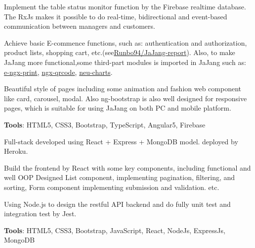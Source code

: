 \documentclass[letterpaper]{deedy-resume} %
\begin{document}
\begin{minipage}[t]{0.66\textwidth}
\vspace{\topsep} %
\begin{tightitemize}
\item Implement the table status monitor function by the Firebase realtime database. The RxJs makes it possible to do real-time, bidirectional and event-based communication between managers and customers.
\item Achieve basic E-commence functions, such as: authentication and authorization, product lists, shopping cart, etc.(see\href{https://github.com/Runbo94/JaJang-report}{Runbo94/JaJang-report}). Also, to make JaJang more functional,some third-part modules is imported in JaJang such as: \href{https://github.com/laixiangran/e-ngx-print}{e-ngx-print}, \href{https://github.com/nacardin/ngx-qrcode}{ngx-qrcode},
\href{https://www.npmjs.com/package/neu-charts}{neu-charts}.
\item  Beautiful style of pages including some animation and fashion web component like card, carousel, modal. Also ng-bootstrap is also well designed for responsive pages, which is suitable for using JaJang on both PC and mobile platform.
\item \textbf{Tools}: HTML5, CSS3, Bootstrap, TypeScript, Angular5, Firebase
\end{tightitemize}

\sectionspace %


\vspace{\topsep} %
\begin{tightitemize}
\item Full-stack developed using React + Express + MongoDB model.
deployed by Heroku.
\item Build the frontend by React with some key components, including functional and well OOP Designed List component, implementing pagination, filtering, and sorting, Form component implementing submission and validation. etc.
\item Using Node.js to design the restful API backend and do fully unit test and integration test by Jest.
\item \textbf{Tools}: HTML5, CSS3, Bootstrap, JavaScript, React, NodeJs, ExpressJs, MongoDB
\end{tightitemize}



\end{minipage}
\end{document}
